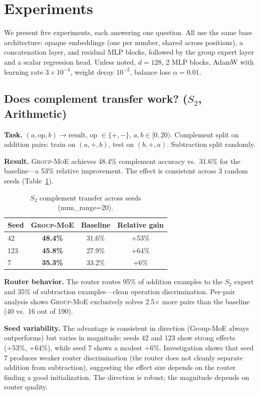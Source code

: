 \documentclass[10pt, letterpaper]{article}
\newcommand{\gmoe}{\textsc{Group-MoE}}
\begin{document}
\section{Experiments}
\label{sec:experiments}

We present five experiments, each answering one question. All use the same base architecture: opaque embeddings (one per number, shared across positions), a concatenation layer, and residual MLP blocks, followed by the group expert layer and a scalar regression head. Unless noted, $d = 128$, 2 MLP blocks, AdamW with learning rate $3 \times 10^{-4}$, weight decay $10^{-2}$, balance loss $\alpha = 0.01$.

\subsection{Does complement transfer work? ($S_2$, Arithmetic)}
\label{sec:exp-s2}

\textbf{Task.} $(a, \text{op}, b) \to \text{result}$, op $\in \{+, -\}$, $a, b \in [0, 20)$. Complement split on addition pairs: train on $(a, +, b)$, test on $(b, +, a)$. Subtraction split randomly.

\textbf{Result.} \gmoe{} achieves 48.4\% complement accuracy vs.\ 31.6\% for the baseline---a 53\% relative improvement. The effect is consistent across 3 random seeds (Table~\ref{tab:s2-seeds}).

\begin{table}[h]
\centering
\caption{$S_2$ complement transfer across seeds (num\_range=20).}
\label{tab:s2-seeds}
\begin{tabular}{lccc}
\toprule
Seed & \gmoe{} & Baseline & Relative gain \\
\midrule
42 & \textbf{48.4\%} & 31.6\% & +53\% \\
123 & \textbf{45.8\%} & 27.9\% & +64\% \\
7 & \textbf{35.3\%} & 33.2\% & +6\% \\
\bottomrule
\end{tabular}
\end{table}

\textbf{Router behavior.} The router routes 95\% of addition examples to the $S_2$ expert and 35\% of subtraction examples---clean operation discrimination. Per-pair analysis shows \gmoe{} exclusively solves 2.5$\times$ more pairs than the baseline (40 vs.\ 16 out of 190).

\textbf{Seed variability.} The advantage is consistent in direction (Group-MoE always outperforms) but varies in magnitude: seeds 42 and 123 show strong effects (+53\%, +64\%), while seed 7 shows a modest +6\%. Investigation shows that seed 7 produces weaker router discrimination (the router does not cleanly separate addition from subtraction), suggesting the effect size depends on the router finding a good initialization. The direction is robust; the magnitude depends on router quality.
\end{document}
